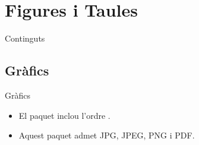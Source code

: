 \section{Figures i Taules}
\begin{frame}{Continguts}
\begin{multicols}{2}
\tableofcontents[currentsection]
\end{multicols}
\end{frame}

\subsection{Gràfics}
\begin{frame}[fragile]{Gràfics}
\begin{itemize}
\item El paquet  inclou l'ordre .
\item Aquest paquet admet JPG, JPEG, PNG i PDF.
\end{itemize}

\end{frame}

